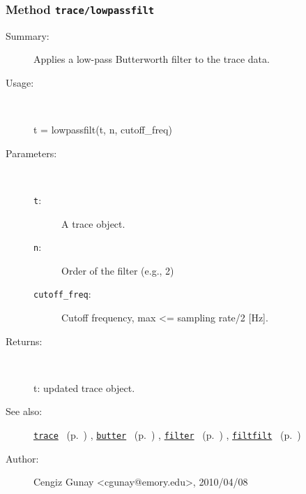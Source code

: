 \subsubsection[Method \texttt{lowpassfilt}]{Method \texttt{trace/lowpassfilt}}%
%
\label{ref_trace__lowpassfilt}%
\hypertarget{ref_trace__lowpassfilt}{}%
\begin{description}
\item[Summary:]Applies a low-pass Butterworth filter to the trace data.
%
\item[Usage:]~%
\begin{lyxcode}%
t = lowpassfilt(t, n, cutoff\_freq)
%
\end{lyxcode}%
%
%
\item[Parameters:]~
\begin{description}%
\item[\texttt{t}:]
 A trace object.
\item[\texttt{n}:]
 Order of the filter (e.g., 2)
\item[\texttt{cutoff\_freq}:]
 Cutoff frequency, max <= sampling rate/2 [Hz].
\end{description}%
%
\item[Returns:
]~

   t: updated trace object.
%
%
\item[See also:]%
\hyperlink{ref_trace}{\texttt{trace}}%
\ (p.~\pageref{ref_trace})%
%
, \hyperlink{ref_butter}{\texttt{butter}}%
\ (p.~\pageref{ref_butter})%
%
, \hyperlink{ref_filter}{\texttt{filter}}%
\ (p.~\pageref{ref_filter})%
%
, \hyperlink{ref_filtfilt}{\texttt{filtfilt}}%
\ (p.~\pageref{ref_filtfilt})%
%
%
\item[Author:]%
Cengiz Gunay <cgunay@emory.edu>, 2010/04/08
%
\end{description}
\methodline%
